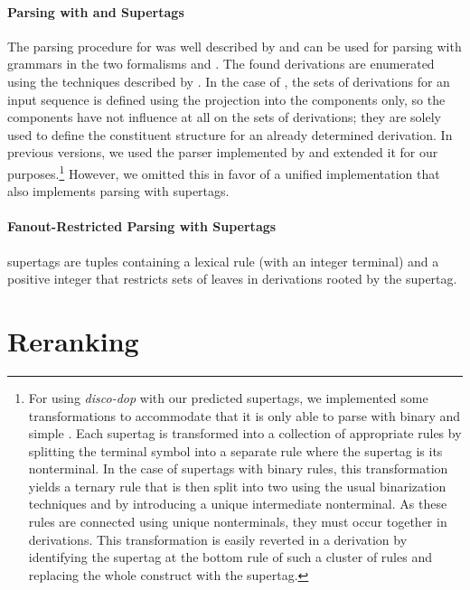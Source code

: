 \documentclass[../document.tex]{subfiles}
\begin{document}
    \paragraph{Parsing with  and  Supertags}
    The parsing procedure for  was well described by \citet[Section 7.1]{Kal10} and can be used for parsing with grammars in the two formalisms  and .
    The found derivations are enumerated using the techniques described by \citet{HuaChia05}.
    In the case of , the sets of derivations for an input sequence is defined using the projection into the  components only, so the  components have not influence at all on the sets of derivations; they are solely used to define the constituent structure for an already determined derivation.
    In previous versions, we used the  parser implemented by \citet{CraSchBod16} and extended it for our purposes.\footnote{
        For using \emph{disco-dop} with our predicted supertags, we implemented some transformations to accommodate that it is only able to parse with binary and simple .
        Each supertag is transformed into a collection of appropriate rules by splitting the terminal symbol into a separate rule where the supertag is its  nonterminal.
        In the case of supertags with binary rules, this transformation yields a ternary rule that is then split into two using the usual binarization techniques and by introducing a unique intermediate nonterminal.
        As these rules are connected using unique nonterminals, they must occur together in derivations.
        This transformation is easily reverted in a derivation by identifying the supertag at the bottom rule of such a cluster of rules and replacing the whole construct with the supertag.
    }
    However, we omitted this in favor of a unified implementation that also implements parsing with  supertags.

    \paragraph{Fanout-Restricted Parsing with  Supertags}
     supertags are tuples containing a lexical  rule (with an integer terminal) and a positive integer that restricts sets of leaves in derivations rooted by the supertag.


    \section{Reranking}

    \ifSubfilesClassLoaded{%
        \printindex
    }{}
\end{document}
